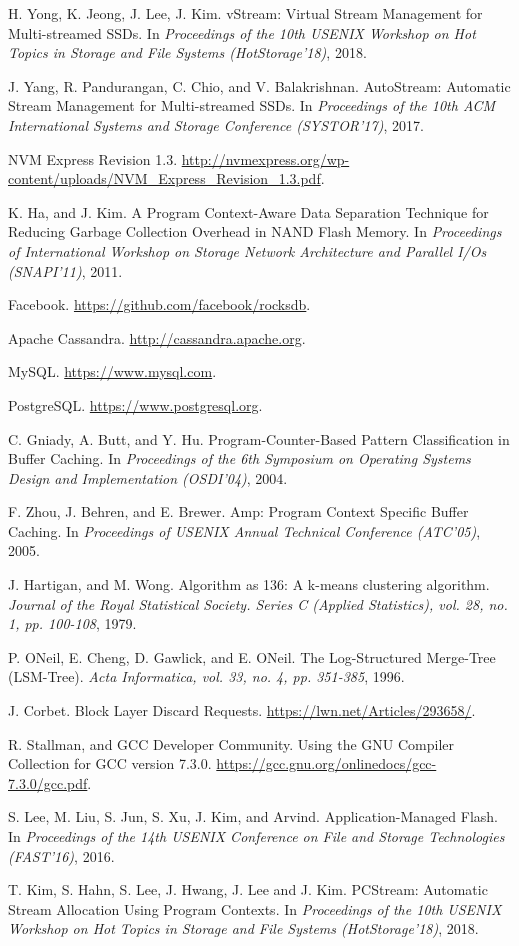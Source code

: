 \begin{thebibliography}{00}
H. Yong, K. Jeong, J. Lee, J. Kim.
vStream: Virtual Stream Management for Multi-streamed SSDs.
In \textit{Proceedings of the 10th USENIX Workshop on Hot Topics in Storage
and File Systems (HotStorage'18)}, 2018.

J. Yang, R. Pandurangan, C. Chio, and V. Balakrishnan.
AutoStream: Automatic Stream Management for Multi-streamed SSDs.
In \textit{Proceedings of the 10th ACM International Systems and Storage Conference (SYSTOR'17)}, 2017.

NVM Express Revision 1.3.
\url{http://nvmexpress.org/wp-content/uploads/NVM_Express_Revision_1.3.pdf}.

K. Ha, and J. Kim.
A Program Context-Aware Data Separation Technique for Reducing Garbage Collection Overhead in NAND Flash Memory.
In \textit{Proceedings of International Workshop on Storage Network Architecture 
and Parallel I/Os (SNAPI'11)}, 2011.

Facebook. 
\url{https://github.com/facebook/rocksdb}.

Apache Cassandra. 
\url{http://cassandra.apache.org}.

MySQL.
\url{https://www.mysql.com}.

PostgreSQL.
\url{https://www.postgresql.org}.

C. Gniady, A. Butt, and Y. Hu.
Program-Counter-Based Pattern Classification in Buffer Caching.
In \textit{Proceedings of the 6th Symposium on Operating Systems Design and Implementation (OSDI'04)}, 2004.

F. Zhou, J. Behren, and E. Brewer.
Amp: Program Context Specific Buffer Caching.
In \textit{Proceedings of USENIX Annual Technical Conference (ATC'05)}, 2005.

J. Hartigan, and M. Wong.
Algorithm as 136: A k-means clustering algorithm.
\textit{Journal of the Royal Statistical Society. Series C (Applied Statistics),
vol. 28, no. 1, pp. 100-108}, 1979.

P. ONeil, E. Cheng, D. Gawlick, and E. ONeil.
The Log-Structured Merge-Tree (LSM-Tree).
\textit{Acta Informatica, vol. 33, no. 4, pp. 351-385}, 1996.

J. Corbet.
Block Layer Discard Requests.
\url{https://lwn.net/Articles/293658/}.

R. Stallman, and GCC Developer Community.
Using the GNU Compiler Collection for GCC version 7.3.0.
\url{https://gcc.gnu.org/onlinedocs/gcc-7.3.0/gcc.pdf}.


S. Lee, M. Liu, S. Jun, S. Xu, J. Kim, and Arvind.
Application-Managed Flash.
In \textit{Proceedings of the 14th USENIX Conference on File and Storage
Technologies (FAST'16)}, 2016.

T. Kim, S. Hahn, S. Lee, J. Hwang, J. Lee and J. Kim.
PCStream: Automatic Stream Allocation Using Program Contexts.
In \textit{Proceedings of the 10th USENIX Workshop on Hot Topics in Storage
and File Systems (HotStorage'18)}, 2018.



\end{thebibliography}

